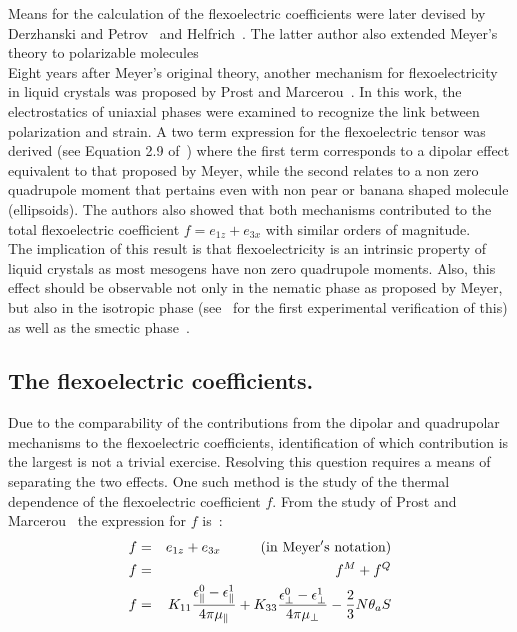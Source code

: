 Means for the calculation of the flexoelectric coefficients were later devised by Derzhanski and
Petrov~\cite{DerzhanskiPetrov71a,DerzhanskiPetrov71a} and Helfrich~\cite{Helfrich71}. The latter
author also extended Meyer's theory to polarizable molecules~\cite{Helfrich74}\\
%
Eight years after Meyer's original theory, another mechanism for flexoelectricity in liquid
crystals was proposed by Prost and Marcerou~\cite{ProstMarcerou77}. In this work, 
the electrostatics of uniaxial phases were examined to recognize the link between polarization and 
strain. A two term expression for the  flexoelectric tensor was derived (see Equation 2.9
of~\cite{ProstMarcerou77}) where 
the first term corresponds to a dipolar effect equivalent to that proposed by Meyer, while the second 
relates to a non zero quadrupole moment that pertains even with non pear or banana shaped molecule 
(\ie ellipsoids).  The authors also showed that both mechanisms contributed to the total flexoelectric 
coefficient  $f = e_{1z} + e_{3x}$ with similar orders of magnitude.\\
%
The implication of this result is that flexoelectricity is an intrinsic property of liquid
crystals as most mesogens have non zero quadrupole moments. Also, this effect should be
observable not only in the nematic phase as proposed by Meyer, but also in the isotropic
phase (see~\cite{ProstMarcerou78b} for the first experimental verification of this) as well 
as the smectic phase~\cite{ProstPershan76}.

\subsection{The flexoelectric coefficients.}

Due to the comparability of the contributions from the dipolar and quadrupolar mechanisms to the
flexoelectric coefficients, identification of which contribution is the largest
is not a trivial exercise. Resolving this question requires a means of separating the two effects.
One such method is the study of the thermal  dependence of the flexoelectric coefficient $f$.  
From the study of Prost and  Marcerou~\cite{ProstMarcerou77, ProstMarcerou78a} 
the expression for $f$ is~:
%
\begin{eqnarray}
	f &=& e_{1z} + e_{3x} \hspace*{1cm} \mrm{(in\ Meyer's\ notation)}	\\
	f &=& f^M + f^Q	\\
	f &=& 	K_{11}\frac{\epsilon^0_\parallel - \epsilon^1_\parallel}{4\pi\mu_\parallel}
		+ K_{33}\frac{\epsilon^0_\perp - \epsilon^1_\perp}{4\pi\mu_\perp}
		-\frac{2}{3}N\theta_a S
		\label{eqn:flexoCoeff}
\end{eqnarray}

